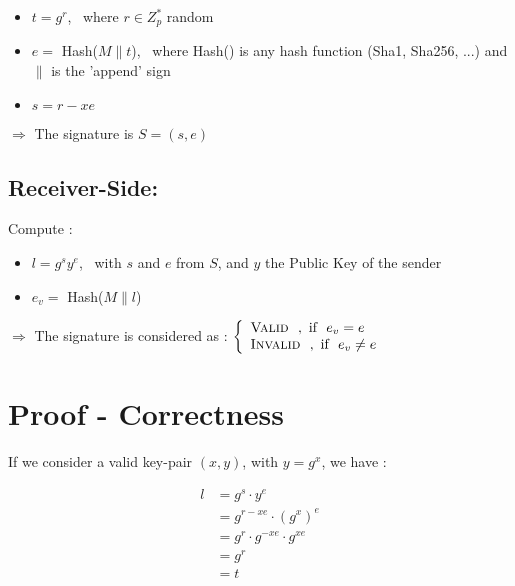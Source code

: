 \documentclass{article}
\begin{document}
\begin{itemize}

	\item $t = g^r$, \ where $r \in Z_p^*$ random

	\item $e =$ Hash($M \| t$), \ where Hash() is any hash function (Sha1, Sha256, ...) and $\|$ is the 'append' sign

	\item $s = r - x e$

\end{itemize}

$\Rightarrow$ The signature is $S = (s, e)$


\subsection{Receiver-Side:}

Compute : \

\begin{itemize}

	\item $l = g^s y^e$, \ with $s$ and $e$ from $S$, and $y$ the Public Key of the sender

	\item $e_v =$ Hash($M \| l$)

\end{itemize}

$\Rightarrow$ The signature is considered as :
	$
    \left\{
        \begin{array}{ll}
        	\textsc{Valid} \ \ , \  \text{if } \ e_v = e \\
        	\textsc{Invalid} \ \ , \  \text{if } \ e_v \neq e
        \end{array}
    \right.
   	$







\section{Proof - Correctness}

If we consider a valid key-pair $(x,y)$, with $y = g^x$, we have :

$$
\begin{align*}
l &= g^s \cdot y^e \\
  &= g^{r - xe} \cdot (g^x)^e \\
  &= g^r \cdot g^{-xe} \cdot g^{xe} \\
  &= g^r \\
  &= t
\end{align*}
$$
\end{document}
